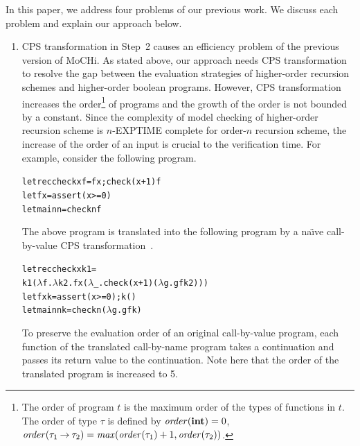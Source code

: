 In this paper, we address four problems of our previous work.
We discuss each problem and explain our approach below.

\vspace{-5pt}
\begin{enumerate}
\item CPS transformation in Step~2 causes an
      efficiency problem of the previous version of MoCHi.  As stated
      above, our approach needs CPS transformation to resolve the gap
      between the evaluation strategies of higher-order recursion
      schemes and higher-order boolean programs.  However, CPS
      transformation increases the order\footnote{The order of program
      $t$ is the maximum order of the types of functions in $t$.  The
      order of type $\tau$ is defined by $\mathit{order}(\mathbf{int})=0$,
      $\mathit{order}({\tau_1}\mathbin{\rightarrow}{\tau_2}) =
      \mathit{max}(\mathit{order}(\tau_1)+1, \mathit{order}(\tau_2))$.}
      of programs and the growth of the order is not bounded by a
      constant.  Since the complexity of model checking of higher-order
      recursion scheme is $n$-EXPTIME complete for order-$n$ recursion
      scheme, the increase of the order of an input is crucial to the
      verification time.
%
      For example, consider the following program.
\vspace*{-5pt}
\begin{alltt}
 letrec check x f = f x; check (x+1) f
 let f x = assert (x >= 0)
 let main n = check n f
\end{alltt}
\vspace*{-5pt}
      The above program is translated into the following program by
      a na\"{\i}ve call-by-value CPS transformation~\cite{Plotkin1975}.
\vspace*{-5pt}
\begin{alltt}
 letrec check x k1 =
   k1 (\(\lambda\)f.\(\lambda\)k2.f x (\(\lambda\)_.check (x+1) (\(\lambda\)g.g f k2)))
 let f x k = assert (x >= 0); k ()
 let main n k = check n (\(\lambda\)g. g f k)
\end{alltt}
\vspace{-5pt}
      To preserve the evaluation order of an original call-by-value program,
      each function of the translated call-by-name program takes
      a continuation and passes its return value to the continuation.  Note here that the
      order of the translated program is increased to 5.

\end{enumerate}

